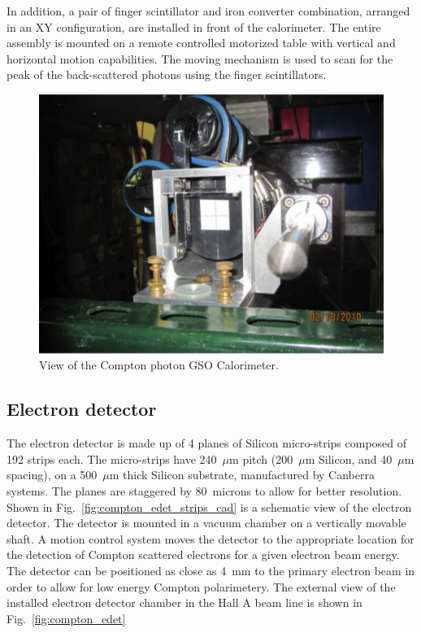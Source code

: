 In addition, a pair of finger scintillator and iron converter combination, arranged in an XY configuration, are installed in front
of the calorimeter. The entire assembly is mounted on a remote controlled motorized  table with vertical and horizontal motion
capabilities. The moving  mechanism is used to scan for the peak of the back-scattered photons using the finger scintillators.

\begin{figure}[htp]
    \begin{center}
        \includegraphics*[angle=0,scale=0.75]{compton_gdet}
    \end{center}
    \caption[compton:photon detector]{
            View of the Compton photon GSO Calorimeter.}
    \label{fig:compton_gdet}
 \end{figure}


\subsection{Electron detector}
\label{sec:compton_edet}

The electron detector is made up of 4 planes of Silicon micro-strips composed
of 192 strips each. The micro-strips have 240~$\mu$m pitch (200~$\mu$m Silicon, and 40~$\mu$m spacing), on a  500~$\mu$m 
thick Silicon substrate, manufactured by Canberra systems. The planes are staggered by 80~microns to allow for better
resolution. Shown in Fig.~\ref{fig:compton_edet_strips_cad} is a schematic view of the electron detector. The detector is mounted  in a vacuum chamber on  a vertically movable shaft. A motion control system moves the detector to the appropriate location for the detection of Compton scattered electrons for a given electron beam energy. The detector can be positioned as close as 4~mm to the primary electron beam in order to allow for low energy Compton polarimetery. The external view of the installed electron detector chamber in the Hall A beam line is shown in  Fig.~\ref{fig:compton_edet} 


